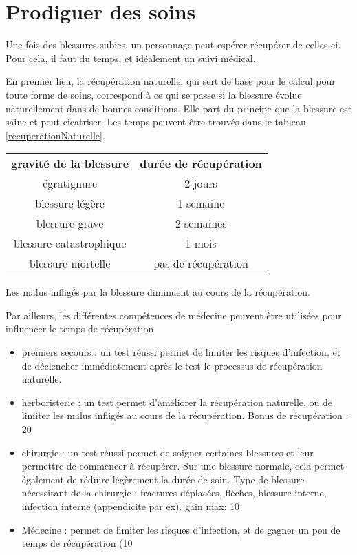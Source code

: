 \documentclass[10pt,a4paper,twocolumn]{book}
\begin{document}
\section{Prodiguer des soins}
Une fois des blessures subies, un personnage peut espérer récupérer de celles-ci. Pour cela, il faut du temps, et idéalement un suivi médical.

En premier lieu, la récupération naturelle, qui sert de base pour le calcul pour toute forme de soins, correspond à ce qui se passe si la blessure évolue naturellement dans de bonnes conditions. Elle part du principe que la blessure est saine et peut cicatriser. Les temps peuvent être trouvés dans le tableau \ref{recuperationNaturelle}.
\begin{table*}
\caption{Récupération naturelle}
\label{recuperationNaturelle}
\begin{center}
\begin{tabular}{cc}
\textbf{gravité de la blessure}&\textbf{durée de récupération}\\
égratignure & 2 jours\\
blessure légère& 1 semaine\\
blessure grave& 2 semaines\\
blessure catastrophique& 1 mois\\
blessure mortelle & pas de récupération
\end{tabular}
\end{center}
\end{table*}

Les malus infligés par la blessure diminuent au cours de la récupération.

Par ailleurs, les différentes compétences de médecine peuvent être utilisées pour influencer le temps de récupération 
\begin{itemize}
\item premiers secours : un test réussi permet de limiter les risques d'infection, et de déclencher immédiatement après le test le processus de récupération naturelle.
\item herboristerie : un test permet d'améliorer la récupération naturelle, ou de limiter les malus infligés au cours de la récupération. Bonus de récupération : 20%
\item chirurgie : un test réussi permet de soigner certaines blessures et leur permettre de commencer à récupérer. Sur une blessure normale, cela permet également de réduire légèrement la durée de soin. Type de blessure nécessitant de la chirurgie : fractures déplacées, flèches, blessure interne, infection interne (appendicite par ex). gain max: 10%
\item Médecine : permet de limiter les risques d'infection, et de gagner un peu de temps de récupération (10%
\end{itemize}
\end{document}
